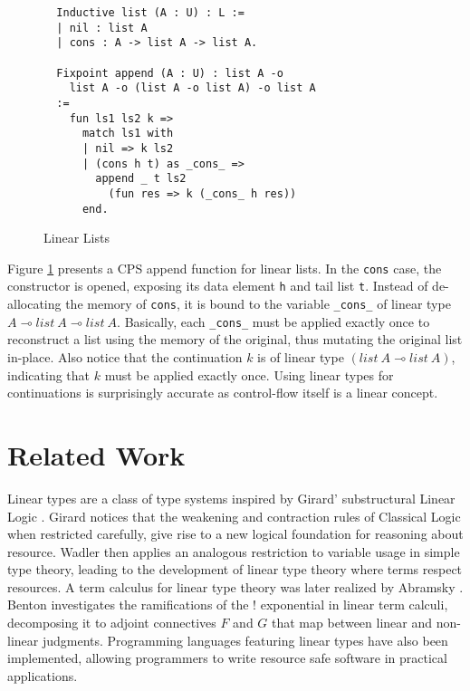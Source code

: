 \documentclass[sigplan,screen]{acmart}
\theoremstyle{definition}
\begin{document}
  \begin{figure}[h]
  \caption{Linear Lists}
  \begin{lstlisting}
  Inductive list (A : U) : L :=
  | nil : list A
  | cons : A -> list A -> list A.
  
  Fixpoint append (A : U) : list A -o 
    list A -o (list A -o list A) -o list A 
  :=
    fun ls1 ls2 k =>
      match ls1 with
      | nil => k ls2
      | (cons h t) as _cons_ =>
        append _ t ls2 
          (fun res => k (_cons_ h res))
      end.
  \end{lstlisting}
  \label{list}
  \Description{}
  \end{figure}

  Figure \ref{list} presents a CPS append function for linear lists. In the \texttt{cons} case, the constructor is opened, exposing its data element \texttt{h} and tail list \texttt{t}. Instead of de-allocating the memory of \texttt{cons}, it is bound to the variable \texttt{_cons_} of linear type $A \multimap list\ A \multimap list\ A$. Basically, each \texttt{_cons_} must be applied exactly once to reconstruct a list using the memory of the original, thus mutating the original list in-place. Also notice that the continuation $k$ is of linear type $(list\ A \multimap list\ A)$, indicating that $k$ must be applied exactly once. Using linear types for continuations is surprisingly accurate as control-flow itself is a linear concept.

  \section{Related Work}
  Linear types are a class of type systems inspired by Girard' substructural Linear Logic \cite{girard}. Girard notices that the weakening and contraction rules of Classical Logic when restricted carefully, give rise to a new logical foundation for reasoning about resource. Wadler \cite{wadler1990,wadler1991} then applies an analogous restriction to variable usage in simple type theory, leading to the development of linear type theory where terms respect resources. A term calculus for linear type theory was later realized by Abramsky \cite{abramsky1993}. Benton \cite{benton1994} investigates the ramifications of the ! exponential in linear term calculi, decomposing it to adjoint connectives $F$ and $G$ that map between linear and non-linear judgments. Programming languages \cite{l3,ats,linear-haskell} featuring linear types have also been implemented, allowing programmers to write resource safe software in practical applications.
  
\end{document}
